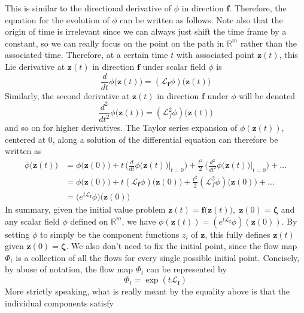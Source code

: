 \documentclass{article}
\begin{document}
      This is similar to the directional derivative of $\phi$ in direction $\mathbf{f}$. Therefore, the equation for the evolution of $\phi$ can be written as follows. Note also that the origin of time is irrelevant since we can always just shift the time frame by a constant, so we can really focus on the point on the path in $\mathbb{R}^m$ rather than the associated time. Therefore, at a certain time $t$ with associated point $\mathbf{z}(t)$, this Lie derivative at $\mathbf{z}(t)$ in direction $\mathbf{f}$ under scalar field $\phi$ is 
      \[\frac{d}{dt} \phi\big(\mathbf{z}(t)\big) = ( \mathcal{L}_\mathbf{f} \phi) \big(\mathbf{z}(t) \big)\]
      Similarly, the second derivative at $\mathbf{z}(t)$ in direction $\mathbf{f}$ under $\phi$ will be denoted 
      \[\frac{d^2}{dt^2} \phi\big( \mathbf{z}(t) \big) = (\mathcal{L}_f^2 \phi) \big( \mathbf{z}(t) \big)\]
      and so on for higher derivatives. The Taylor series expansion of $\phi(\mathbf{z}(t))$, centered at $0$, along a solution of the differential equation can therefore be written as 
      \begin{align*}
          \phi \big(\mathbf{z}(t) \big) & = \phi \big(\mathbf{z}(0) \big) + t \, \bigg( \frac{d}{dt} \phi \big( \mathbf{z}(t)\big) \bigg|_{t = 0} \bigg) + \frac{t^2}{2} \, \bigg( \frac{d^2}{dt^2} \phi\big( \mathbf{z}(t)\big) \bigg|_{t = 0} \bigg) + \ldots \\
          & = \phi \big(\mathbf{z}(0) \big) + t (\mathcal{L}_\mathbf{f} \phi) \big( \mathbf{z}(0) \big) + \frac{t^2}{2} ( \mathcal{L}_f^2 \phi) \big( \mathbf{z}(0)\big) + \ldots \\
          & = \big( e^{t \mathcal{L}_\mathbf{f}} \phi) \big( \mathbf{z}(0)\big) 
      \end{align*}
      In summary, given the initial value problem $\mathbf{\dot{z}}(t) = \mathbf{f}\big( \mathbf{z}(t)\big), \; \mathbf{z}(0) = \boldsymbol{\zeta}$ and any scalar field $\phi$ defined on $\mathbb{R}^m$, we have $\phi( \mathbf{z}(t)) = ( e^{t \mathcal{L}_\mathbf{f}} \phi)(\mathbf{z}(0))$. By setting $\phi$ to simply be the component functions $z_i$ of $\mathbf{z}$, this fully defines $\mathbf{z}(t)$ given $\mathbf{z}(0) = \boldsymbol{\zeta}$. We also don't need to fix the initial point, since the flow map $\Phi_t$ is a collection of all the flows for every single possible initial point. Concisely, by abuse of notation, the flow map $\Phi_t$ can be represented by 
      \[\Phi_t = \exp(t \mathcal{L}_\mathbf{f})\]
      More strictly speaking, what is really meant by the equality above is that the individual components satisfy 
\end{document}
